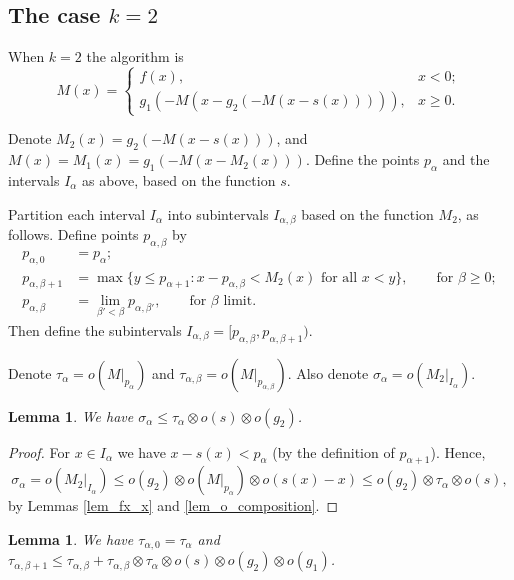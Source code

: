 \documentclass{article}
\newtheorem{Lemma}[Theorem]{Lemma}
\theoremstyle{definition}
\begin{document}
\subsection{The case $k=2$}

When $k=2$ the algorithm is
\begin{equation*}
    M(x) = \begin{cases}f(x),& x<0;\\g_1(-M(x-g_2(-M(x-s(x))))),& x\ge 0.\end{cases}
\end{equation*}

Denote $M_2(x) = g_2(-M(x-s(x)))$, and $M(x) = M_1(x) = g_1(-M(x-M_2(x)))$. Define the points $p_\alpha$ and the intervals $I_\alpha$ as above, based on the function $s$.

Partition each interval $I_\alpha$ into subintervals $I_{\alpha,\beta}$ based on the function $M_2$, as follows. Define points $p_{\alpha,\beta}$ by
\begin{align*}
    p_{\alpha,0} &= p_\alpha;\\
    p_{\alpha,\beta+1} &= \max{\{ y\le p_{\alpha+1} : x- p_{\alpha,\beta}<M_2(x) \text{ for all $x<y$}\}}, \qquad \text{for $\beta\ge 0$};\\
    p_{\alpha,\beta} &= \lim_{\beta'<\beta} p_{\alpha,\beta'}, \qquad \text{for $\beta$ limit}.
\end{align*}
Then define the subintervals $I_{\alpha,\beta}=[p_{\alpha,\beta}, p_{\alpha,\beta+1})$.

Denote $\tau_\alpha = o(M|_{p_\alpha})$ and $\tau_{\alpha,\beta} = o(M|_{p_{\alpha,\beta}})$. Also denote $\sigma_\alpha=o(M_2|_{I_\alpha})$.

\begin{Lemma}\label{lem_sigma_alpha}
    We have $\sigma_{\alpha}\le \tau_\alpha\otimes o(s)\otimes o(g_2)$.
\end{Lemma}

\begin{proof}
    For $x\in I_\alpha$ we have $x-s(x)<p_\alpha$ (by the definition of $p_{\alpha+1}$). Hence,
    \begin{equation*}
        \sigma_\alpha = o(M_2|_{I_\alpha})\le o(g_2)\otimes o(M|_{p_\alpha})\otimes o(s(x)-x)\le o(g_2)\otimes\tau_\alpha\otimes o(s),
    \end{equation*}
     by Lemmas \ref{lem_fx_x} and \ref{lem_o_composition}.
\end{proof}

\begin{Lemma}\label{lem_tau_alpha_beta}
    We have $\tau_{\alpha,0} = \tau_\alpha$ and $\tau_{\alpha,\beta+1} \le \tau_{\alpha,\beta}+\tau_{\alpha,\beta}\otimes\tau_\alpha\otimes o(s)\otimes o(g_2)\otimes o(g_1)$.
\end{Lemma}
\end{document}
